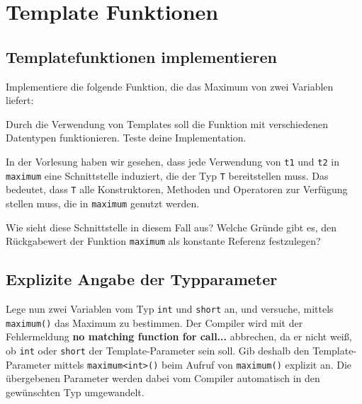 \section{Template Funktionen}
\subsection{Templatefunktionen implementieren}
Implementiere die folgende Funktion, die das Maximum von zwei Variablen liefert:



Durch die Verwendung von Templates soll die Funktion mit verschiedenen Datentypen funktionieren.
Teste deine Implementation.

In der Vorlesung haben wir gesehen, dass jede Verwendung von \lstinline{t1} und \lstinline{t2} in \lstinline{maximum} eine Schnittstelle induziert, die der Typ \lstinline{T} bereitstellen muss.
Das bedeutet, dass \lstinline{T} alle Konstruktoren, Methoden und Operatoren zur Verfügung stellen muss, die in \lstinline{maximum} genutzt werden.

Wie sieht diese Schnittstelle in diesem Fall aus?
Welche Gründe gibt es, den Rückgabewert der Funktion \lstinline{maximum} als konstante Referenz festzulegen?


\subsection{Explizite Angabe der Typparameter}
Lege nun zwei Variablen vom Typ \lstinline{int} und \lstinline{short} an, und versuche, mittels \lstinline{maximum()} das Maximum zu bestimmen.
Der Compiler wird mit der Fehlermeldung \textbf{no matching function for call...} abbrechen, da er nicht weiß, ob \lstinline{int} oder \lstinline{short} der Template-Parameter sein soll.
Gib deshalb den Template-Parameter mittels \lstinline{maximum<int>()} beim Aufruf von \lstinline{maximum()} explizit an.
Die übergebenen Parameter werden dabei vom Compiler automatisch in den gewünschten Typ umgewandelt.

